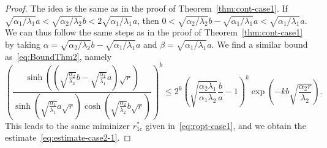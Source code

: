 \documentclass[reqno]{amsart}
\begin{document}
\begin{proof}
The idea is the same as in the proof of Theorem~\ref{thm:cont-case1}.
If $\sqrt{\alpha_1/\lambda_1} a < \sqrt{\alpha_2/\lambda_2} b < 2\sqrt{\alpha_1/\lambda_1} a$, then $0<\sqrt{\alpha_2/\lambda_2} b - \sqrt{\alpha_1/\lambda_1} a < \sqrt{\alpha_1/\lambda_1} a$. We can thus follow the same steps as in the proof of Theorem~\ref{thm:cont-case1} by taking $\alpha = \sqrt{\alpha_2/\lambda_2} b - \sqrt{\alpha_1/\lambda_1} a$ and $\beta = \sqrt{\alpha_1/\lambda_1} a$.
We find a similar bound as~\eqref{eq:BoundThm2}, namely
\begin{equation}\label{eq:BoundThm3}
	\left(\frac{\sinh\left(\left(\sqrt{\frac{\alpha_2}{\lambda_2}} b - \sqrt{\frac{\alpha_1}{\lambda_1}} a \right) \sqrt{r} \right)}{\sinh\left(\sqrt{\frac{\alpha_1}{\lambda_1}} a \sqrt{r}\right)\cosh\left(\sqrt{\frac{\alpha_2}{\lambda_2}} b \sqrt{r}\right)}\right)^k
	\leq 2^k\left(\sqrt{\frac{\alpha_2 \lambda_1}{\alpha_1\lambda_2}}\frac{b}{a} - 1\right)^k \exp\left(-kb\sqrt{\frac{\alpha_2r}{\lambda_2}}\right).
\end{equation}
This leads to the same miminizer $r^*_{1c}$ given in~\eqref{eq:ropt-case1}, and we obtain the estimate~\eqref{eq:estimate-case2-1}.


\end{proof}
\end{document}
